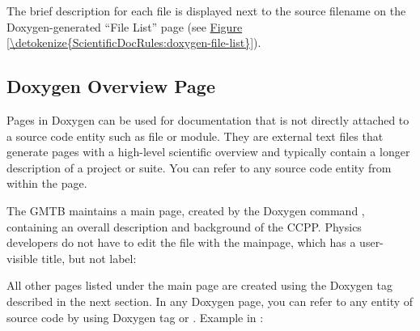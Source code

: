 \documentclass[letterpaper,10pt,english]{sphinxmanual}
\begin{document}
\begin{sphinxVerbatim}[commandchars=\\\{\}]
\end{sphinxVerbatim}

The brief description for each file is displayed next to the source filename
on the Doxygen-generated “File List” page (see \hyperref[\detokenize{ScientificDocRules:doxygen-file-list}]{Figure \ref{\detokenize{ScientificDocRules:doxygen-file-list}}}).

\begin{figure}[htbp]
\centering

\noindent{}
\end{figure}


\subsection{Doxygen Overview Page}
\label{\detokenize{ScientificDocRules:doxygen-overview-page}}
Pages in Doxygen can be used for documentation that is not directly attached
to a source code entity such as file or module. They are external text files
that generate pages with a high-level scientific overview and
typically contain a longer description of a project or suite. You can refer to
any source code entity from within the page.

The GMTB maintains a main page, created by the Doxygen command
, containing an overall description and background of the CCPP.
Physics developers do not have to edit the file with the mainpage, which has a
user-visible title, but not label:

\begin{sphinxVerbatim}[commandchars=\\\{\}]
\end{sphinxVerbatim}

All other pages listed under the main page are created using the Doxygen
tag  described in the next section. In any Doxygen page,
you can refer to any entity of source code by using Doxygen tag 
or . Example in :
\end{document}
